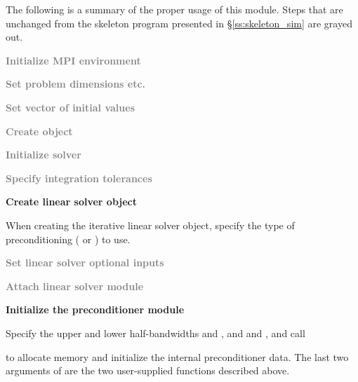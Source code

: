 The following is a summary of the proper usage of this module. Steps that are
unchanged from the skeleton program presented in \S\ref{ss:skeleton_sim} are grayed out.
\begin{Steps}
\item
  \textcolor{gray}{\bf Initialize MPI environment}

\item
  \textcolor{gray}{\bf Set problem dimensions etc.}

\item
  \textcolor{gray}{\bf Set vector of initial values}

\item
  \textcolor{gray}{\bf Create {\cvodes} object}

\item
  \textcolor{gray}{\bf Initialize {\cvodes} solver}

\item
  \textcolor{gray}{\bf Specify integration tolerances}

\item
  {\bf Create linear solver object}

  When creating the iterative linear solver object, specify the type
  of preconditioning ( or ) to use.

\item
  \textcolor{gray}{\bf Set linear solver optional inputs}

\item \label{i:bbdpre_attach}
  \textcolor{gray}{\bf Attach linear solver module}

\item \label{i:bbdpre_init}
  {\bf Initialize the {\cvbbdpre} preconditioner module}

  Specify the upper and lower half-bandwidths  and , and
   and , and call


   to allocate memory and initialize the internal preconditioner data.
   The last two arguments of  are the two user-supplied
   functions described above.


\end{Steps}
